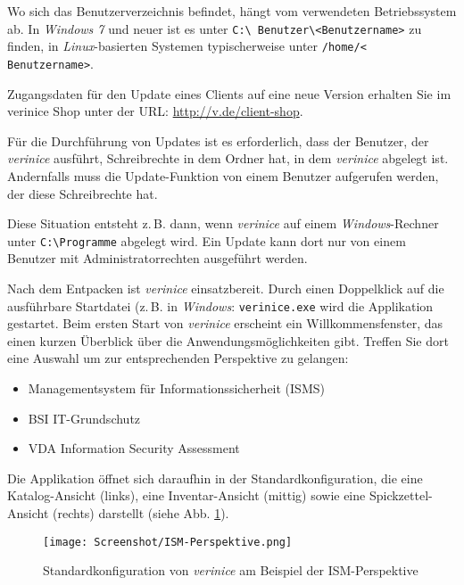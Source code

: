 \documentclass[a4paper,10pt]{book}
\newcommand{\zB}{\mbox{z.\,B.}\xspace}
\begin{document}
Wo sich das Benutzerverzeichnis befindet, hängt vom verwendeten Betriebssystem
ab. In \textit{Windows 7} und neuer ist es unter \texttt{C:\textbackslash
Benutzer\textbackslash \textless Benutzername\textgreater} zu finden, in
\textit{Linux}-basierten Systemen typischerweise unter \texttt{/home/\textless
Benutzername\textgreater}.

Zugangsdaten für den Update eines Clients auf eine neue Version erhalten Sie im verinice Shop
unter der URL: \url{http://v.de/client-shop}.

Für die Durchführung von Updates ist es erforderlich, dass der Benutzer, der
\textit{verinice} ausführt, Schreibrechte in dem Ordner hat, in dem
\textit{verinice} abgelegt ist. Andernfalls muss die Update-Funktion von einem
Benutzer aufgerufen werden, der diese Schreibrechte hat.

Diese Situation entsteht \zB dann, wenn \textit{verinice} auf einem
\textit{Windows}-Rechner unter \texttt{C:\textbackslash Programme} abgelegt
wird. Ein Update kann dort nur von einem Benutzer mit Administratorrechten
ausgeführt werden.

Nach dem Entpacken ist \textit{verinice} einsatzbereit. Durch einen Doppelklick
auf die ausführbare Startdatei (\zB in \textit{Windows}: \texttt{verinice.exe}
wird die Applikation gestartet. Beim ersten Start von \textit{verinice}
erscheint ein Willkommensfenster, das einen kurzen Überblick über die
Anwendungsmöglichkeiten gibt. Treffen Sie dort eine Auswahl um zur
entsprechenden Perspektive zu gelangen:

\begin{itemize}
  \item Managementsystem für Informationssicherheit (ISMS)
  \item BSI IT-Grundschutz
  \item VDA Information Security Assessment
\end{itemize}

Die Applikation öffnet sich daraufhin in der Standardkonfiguration, die eine
Katalog-Ansicht (links), eine Inventar-Ansicht (mittig) sowie eine
Spickzettel-Ansicht (rechts) darstellt (siehe Abb.
\ref{fig:standardkonfiguration-von-verinice}).

\begin{figure}[htb!]
  \centering
  \texttt{[image: Screenshot/ISM-Perspektive.png]}
  \caption{Standardkonfiguration von \textit{verinice} am Beispiel der
    ISM-Perspektive}
  \label{fig:standardkonfiguration-von-verinice}
\end{figure}
\end{document}
